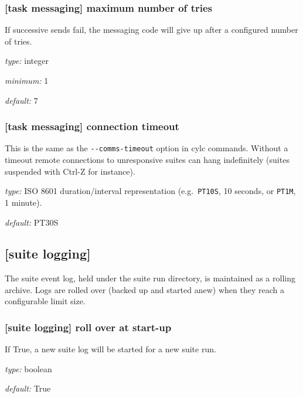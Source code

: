 \subsubsection[maximum number of tries]{[task messaging] \textrightarrow maximum number of tries}

If successive sends fail, the messaging code will give up after a
configured number of tries.

\begin{myitemize}
\item {\em type:} integer
\item {\em minimum:} 1
\item {\em default:} 7
\end{myitemize}

\subsubsection[connection timeout]{[task messaging] \textrightarrow connection timeout}

This is the same as the \lstinline=--comms-timeout= option in cylc
commands. Without a timeout remote connections to unresponsive
suites can hang indefinitely (suites suspended with Ctrl-Z for instance).

\begin{myitemize}
\item {\em type:} ISO 8601 duration/interval representation (e.g.\ 
\lstinline=PT10S=, 10 seconds, or \lstinline=PT1M=, 1 minute).
\item {\em default:} PT30S
\end{myitemize}

\subsection{[suite logging]}

The suite event log, held under the suite run directory, is maintained
as a rolling archive. Logs are rolled over (backed up and started anew)
when they reach a configurable limit size.

\subsubsection[roll over at start-up]{[suite logging] \textrightarrow roll over at start-up}

If True, a new suite log will be started for a new suite run.

\begin{myitemize}
\item {\em type:} boolean
\item {\em default:} True
\end{myitemize}

